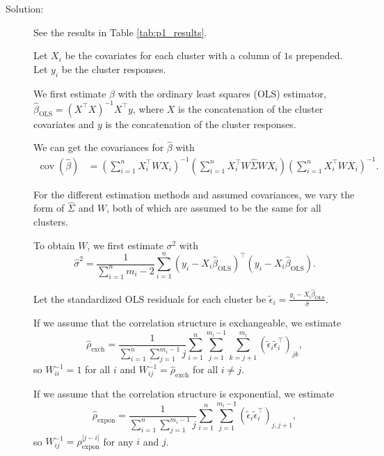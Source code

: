 \documentclass[11pt, letterpaper]{article}
\begin{document}
\begin{description}
\item[Solution:] See the results in Table \ref{tab:p1_results}.

  Let $X_i$ be the covariates for each cluster with a column of $1$s
  prepended. Let $y_i$ be the cluster responses.

  We first estimate $\beta$ with the ordinary least squares (OLS) estimator,
  $\hat{\beta}_{\mathrm{OLS}} = \left(X^\intercal X\right)^{-1}X^\intercal y$,
  where $X$ is the concatenation of the cluster covariates and $y$ is the
  concatenation of the cluster responses.
  

  We can get the covariances for $\hat{\beta}$ with
  \begin{align*}
    \operatorname{cov}\left(\hat{\beta}\right)
    &= \left(\sum_{i=1}^n X_i^\intercal W X_i\right)^{-1}
    \left(\sum_{i=1}^n X_i^\intercal W \hat{\Sigma} W X_i\right)
    \left(\sum_{i=1}^n X_i^\intercal W X_i\right)^{-1}.
  \end{align*}

  For the different estimation methods and assumed covariances, we vary the form
  of $\hat{\Sigma}$ and $W$, both of which are assumed to be the same for all
  clusters.

  To obtain $W$, we first estimate $\sigma^2$ with
  \begin{equation}
    \hat{\sigma}^2 = \frac{1}{\sum_{i=1}^nm_i - 2}\sum_{i=1}^n
    \left(y_{i} - X_{i}\hat{\beta}_{\mathrm{OLS}}\right)^\intercal
    \left(y_{i} - X_{i}\hat{\beta}_{\mathrm{OLS}}\right).
  \end{equation}


  Let the standardized OLS residuals for each cluster be
  $\tilde{\epsilon}_i = \frac{y_i -
    X_i\hat{\beta}_{\mathrm{OLS}}}{\hat{\sigma}}.$

  If we assume that the correlation structure is exchangeable, we estimate
  \begin{equation}
    \hat{\rho}_{\mathrm{exch}} =
    \frac{1}{\sum_{i=1}^n\sum_{j=1}^{m_i - 1} j}\sum_{i=1}^n\sum_{j=1}^{m_i - 1}\sum_{k=j + 1}^{m_i}
    \left(\tilde{\epsilon}_i\tilde{\epsilon}_i^\intercal\right)_{jk},
  \end{equation}
  so $W^{-1}_{ii} = 1$ for all $i$ and
  $W_{ij}^{-1} = \hat{\rho}_{\mathrm{exch}}$ for all $i \neq j$.

  If we assume that the correlation structure is exponential, we estimate
  \begin{equation} \hat{\rho}_{\mathrm{expon}} =
    \frac{1}{\sum_{i=1}^n\sum_{j=1}^{m_i - 1}
      j}\sum_{i=1}^n\sum_{j=1}^{m_i - 1}
    \left(\tilde{\epsilon}_i\tilde{\epsilon}_i^\intercal\right)_{j,j+1},
  \end{equation}
  so
  $W_{ij}^{-1} = \hat{\rho}_{\mathrm{expon}}^{\left\lvert j - i \right\rvert}$
  for any $i$ and $j$.
  

\end{description}
\end{document}
